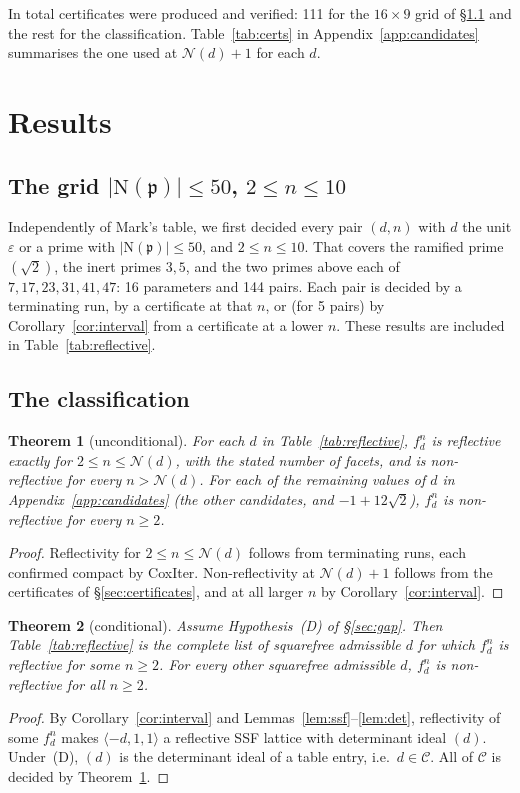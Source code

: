\documentclass[11pt]{amsart}
\newtheorem{theorem}{Theorem}[section]
\theoremstyle{definition}
\newcommand{\eps}{\varepsilon}
\newcommand{\N}{\mathrm{N}}
\newcommand{\Nmax}{\mathcal{N}}
\begin{document}
In total \NCerts{} certificates were produced and verified: 111 for the $16\times9$ grid of
\S\ref{sec:grid} and the rest for the classification. Table~\ref{tab:certs} in
Appendix~\ref{app:candidates} summarises the one used at $\Nmax(d)+1$ for each $d$.

\section{Results}\label{sec:results}

\subsection{The grid $|\N(\mathfrak p)|\le50$, $2\le n\le10$}\label{sec:grid}
Independently of Mark's table, we first decided every pair $(d,n)$ with $d$ the unit $\eps$
or a prime with $|\N(\mathfrak p)|\le50$, and $2\le n\le10$. That covers the ramified prime
$(\sqrt2)$, the inert primes $3,5$, and the two primes above each of $7,17,23,31,41,47$:
16 parameters and 144 pairs. Each pair is decided by a terminating run, by a certificate at
that $n$, or (for 5 pairs) by Corollary~\ref{cor:interval} from a certificate at a lower $n$.
These results are included in Table~\ref{tab:reflective}.

\subsection{The classification}
\begin{theorem}[unconditional]\label{thm:main}
For each $d$ in Table~\ref{tab:reflective}, $f_d^n$ is reflective exactly for
$2\le n\le\Nmax(d)$, with the stated number of facets, and is non-reflective for every
$n>\Nmax(d)$. For each of the remaining \NNon{} values of $d$ in
Appendix~\ref{app:candidates} (the other candidates, and $-1+12\sqrt2$), $f_d^n$ is
non-reflective for every $n\ge2$.
\end{theorem}
\begin{proof}
Reflectivity for $2\le n\le\Nmax(d)$ follows from terminating runs, each confirmed compact by
CoxIter. Non-reflectivity at $\Nmax(d)+1$ follows from the certificates of
\S\ref{sec:certificates}, and at all larger $n$ by Corollary~\ref{cor:interval}.
\end{proof}

\begin{theorem}[conditional]\label{thm:conditional}
Assume Hypothesis~(D) of \S\ref{sec:gap}. Then Table~\ref{tab:reflective} is the complete list
of squarefree admissible $d$ for which $f_d^n$ is reflective for some $n\ge2$. For every other
squarefree admissible $d$, $f_d^n$ is non-reflective for all $n\ge2$.
\end{theorem}
\begin{proof}
By Corollary~\ref{cor:interval} and Lemmas~\ref{lem:ssf}--\ref{lem:det}, reflectivity of some
$f_d^n$ makes $\langle-d,1,1\rangle$ a reflective SSF lattice with determinant ideal $(d)$.
Under~(D), $(d)$ is the determinant ideal of a table entry, i.e.\ $d\in\mathcal C$. All of
$\mathcal C$ is decided by Theorem~\ref{thm:main}.
\end{proof}
\end{document}
